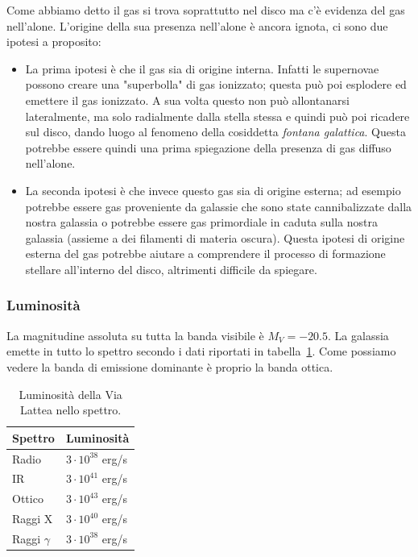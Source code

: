 Come abbiamo detto il gas si trova soprattutto nel disco ma c’è evidenza del gas nell’alone. L’origine della sua presenza nell'alone è ancora ignota, ci sono due ipotesi a proposito:
\begin{itemize}
    \item La prima ipotesi è che il gas sia di origine interna. Infatti le supernovae possono creare una "superbolla" di gas ionizzato; questa può poi esplodere ed emettere il gas ionizzato. A sua volta questo non può allontanarsi lateralmente, ma solo radialmente dalla stella stessa e quindi può poi ricadere sul disco, dando luogo al fenomeno della cosiddetta \emph{fontana galattica}. Questa potrebbe essere quindi una prima spiegazione della presenza di gas diffuso nell'alone.
    \item La seconda ipotesi è che invece questo gas sia di origine esterna; ad esempio potrebbe essere gas proveniente da galassie che sono state cannibalizzate dalla nostra galassia o potrebbe essere gas primordiale in caduta sulla nostra galassia (assieme a dei filamenti di materia oscura).  Questa ipotesi di origine esterna del gas potrebbe aiutare a comprendere il processo di formazione stellare all'interno del disco, altrimenti difficile da spiegare.
\end{itemize} 

\subsubsection{Luminosità}
La magnitudine assoluta su tutta la banda visibile è $M_V = -20.5$. La galassia emette in tutto lo spettro secondo i dati riportati in tabella~\ref{tab:luminosita-via-lattea}. Come possiamo vedere la banda di emissione dominante è proprio la banda ottica.

\begin{table}[!ht]
    \caption{Luminosità della Via Lattea nello spettro.}
    \label{tab:luminosita-via-lattea}
    \centering
    \begin{tabular}{ll}
    \toprule
    Spettro &  Luminosità \\
    \midrule
    Radio & $3 \cdot 10^{38}$ \si{erg}/\si{s}\\
    IR & $3 \cdot 10^{41}$ \si{erg}/\si{s}\\
    Ottico & $3 \cdot 10^{43}$ \si{erg}/\si{s}\\
    Raggi X & $3 \cdot 10^{40}$ \si{erg}/\si{s}\\
    Raggi $\gamma$ & $3 \cdot 10^{38}$ \si{erg}/\si{s}\\
    \bottomrule
    \end{tabular}
\end{table}


